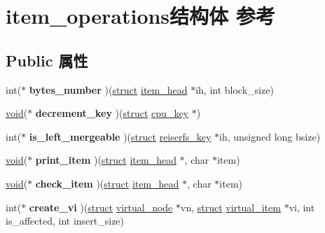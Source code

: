 \hypertarget{structitem__operations}{}\section{item\+\_\+operations结构体 参考}
\label{structitem__operations}
\subsection*{Public 属性}
\begin{DoxyCompactItemize}
\item 
\mbox{\label{structitem__operations_a86c6cfe0afa2e36b2dadb5ba8a05ae58}} 
int($\ast$ {\bfseries bytes\+\_\+number} )(\hyperlink{interfacestruct}{struct} \hyperlink{structitem__head}{item\+\_\+head} $\ast$ih, int block\+\_\+size)
\item 
\mbox{\label{structitem__operations_aa23231ef464fdd7f79a982f91e753747}} 
\hyperlink{interfacevoid}{void}($\ast$ {\bfseries decrement\+\_\+key} )(\hyperlink{interfacestruct}{struct} \hyperlink{structcpu__key}{cpu\+\_\+key} $\ast$)
\item 
\mbox{\label{structitem__operations_ae52b44ee76d39aedd891c2e9f2db3bf7}} 
int($\ast$ {\bfseries is\+\_\+left\+\_\+mergeable} )(\hyperlink{interfacestruct}{struct} \hyperlink{structreiserfs__key}{reiserfs\+\_\+key} $\ast$ih, unsigned long bsize)
\item 
\mbox{\label{structitem__operations_aa49a47f11054a26c79f49c76f4316452}} 
\hyperlink{interfacevoid}{void}($\ast$ {\bfseries print\+\_\+item} )(\hyperlink{interfacestruct}{struct} \hyperlink{structitem__head}{item\+\_\+head} $\ast$, char $\ast$item)
\item 
\mbox{\label{structitem__operations_aebe395dfa8d9d28a759669d1eea99555}} 
\hyperlink{interfacevoid}{void}($\ast$ {\bfseries check\+\_\+item} )(\hyperlink{interfacestruct}{struct} \hyperlink{structitem__head}{item\+\_\+head} $\ast$, char $\ast$item)
\item 
\mbox{\label{structitem__operations_a40eb323755745ff8818c3729f71c955e}} 
int($\ast$ {\bfseries create\+\_\+vi} )(\hyperlink{interfacestruct}{struct} \hyperlink{structvirtual__node}{virtual\+\_\+node} $\ast$vn, \hyperlink{interfacestruct}{struct} \hyperlink{structvirtual__item}{virtual\+\_\+item} $\ast$vi, int is\+\_\+affected, int insert\+\_\+size)

\end{DoxyCompactItemize}
